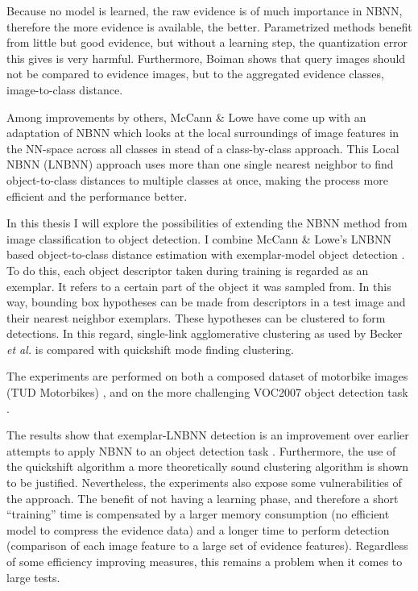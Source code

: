 Because no model is learned, the raw evidence is of much importance in NBNN, therefore the more evidence is available, the better. Parametrized methods benefit from little but good evidence, but without a learning step, the quantization error this gives is very harmful. Furthermore, Boiman shows that query images should not be compared to evidence images, but to the aggregated evidence classes, image-to-class distance.

Among improvements by others, McCann \& Lowe \cite{mccann2012local} have come up with an adaptation of NBNN which looks at the local surroundings of image features in the NN-space across all classes in stead of a class-by-class approach. This Local NBNN (LNBNN) approach uses more than one single nearest neighbor to find object-to-class distances to multiple classes at once, making the process more efficient and the performance better. 

In this thesis I will explore the possibilities of extending the NBNN method from image classification to object detection. I combine McCann \& Lowe's LNBNN based object-to-class distance estimation with exemplar-model object detection \cite{becker2012codebook, chum2007exemplar}. To do this, each object descriptor taken during training is regarded as an exemplar. It refers to a certain part of the object it was sampled from. In this way, bounding box hypotheses can be made from descriptors in a test image and their nearest neighbor exemplars. These hypotheses can be clustered to form detections. In this regard, single-link agglomerative clustering as used by Becker \emph{et al.} \cite{becker2012codebook} is compared with quickshift mode finding clustering. 

The experiments are performed on both a composed dataset of motorbike images (TUD Motorbikes) \cite{becker2012codebook, fritz2005integrating}, and on the more challenging VOC2007 object detection task \cite{pascal-voc-2007}.

The results show that exemplar-LNBNN detection is an improvement over earlier attempts to apply NBNN to an object detection task \cite{becker2012codebook}. Furthermore, the use of the quickshift algorithm a more theoretically sound clustering algorithm is shown to be justified. Nevertheless, the experiments also expose some vulnerabilities of the approach. The benefit of not having a learning phase, and therefore a short ``training'' time is compensated by a larger memory consumption (no efficient model to compress the evidence data) and a longer time to perform detection (comparison of each image feature to a large set of evidence features). Regardless of some efficiency improving measures, this remains a problem when it comes to large tests.

